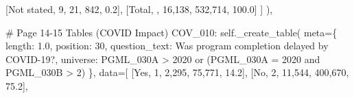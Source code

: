 \documentclass[
  11pt,
  a4paper,
]{article}
\newenvironment{Shaded}{\begin{snugshade}}{\end{snugshade}}
\newcommand{\CommentTok}[1]{\textcolor[rgb]{0.37,0.37,0.37}{#1}}
\newcommand{\NormalTok}[1]{\textcolor[rgb]{0.00,0.23,0.31}{#1}}
\newcommand{\OperatorTok}[1]{\textcolor[rgb]{0.37,0.37,0.37}{#1}}
\newcommand{\StringTok}[1]{\textcolor[rgb]{0.13,0.47,0.30}{#1}}
\newcommand{\VariableTok}[1]{\textcolor[rgb]{0.07,0.07,0.07}{#1}}
\begin{document}
\begin{Shaded}
\begin{Highlighting}[]
\NormalTok{                    [}\StringTok{\textquotesingle{}Not stated\textquotesingle{}}\NormalTok{, }\StringTok{\textquotesingle{}9\textquotesingle{}}\NormalTok{, }\StringTok{\textquotesingle{}21\textquotesingle{}}\NormalTok{, }\StringTok{\textquotesingle{}842\textquotesingle{}}\NormalTok{, }\StringTok{\textquotesingle{}0.2\textquotesingle{}}\NormalTok{],}
\NormalTok{                    [}\StringTok{\textquotesingle{}Total\textquotesingle{}}\NormalTok{, }\StringTok{\textquotesingle{}\textquotesingle{}}\NormalTok{, }\StringTok{\textquotesingle{}16,138\textquotesingle{}}\NormalTok{, }\StringTok{\textquotesingle{}532,714\textquotesingle{}}\NormalTok{, }\StringTok{\textquotesingle{}100.0\textquotesingle{}}\NormalTok{]}
\NormalTok{                ]}
\NormalTok{            ),}
            
            \CommentTok{\# Page 14{-}15 Tables (COVID Impact)}
            \StringTok{\textquotesingle{}COV\_010\textquotesingle{}}\NormalTok{: }\VariableTok{self}\NormalTok{.\_create\_table(}
\NormalTok{                meta}\OperatorTok{=}\NormalTok{\{}
                    \StringTok{\textquotesingle{}length\textquotesingle{}}\NormalTok{: }\StringTok{\textquotesingle{}1.0\textquotesingle{}}\NormalTok{, }\StringTok{\textquotesingle{}position\textquotesingle{}}\NormalTok{: }\StringTok{\textquotesingle{}30\textquotesingle{}}\NormalTok{,}
                    \StringTok{\textquotesingle{}question\_text\textquotesingle{}}\NormalTok{: }\StringTok{\textquotesingle{}Was program completion delayed by COVID{-}19?\textquotesingle{}}\NormalTok{,}
                    \StringTok{\textquotesingle{}universe\textquotesingle{}}\NormalTok{: }\StringTok{\textquotesingle{}PGML\_030A \textgreater{} 2020 or (PGML\_030A = 2020 and PGML\_030B \textgreater{} 2)\textquotesingle{}}
\NormalTok{                \},}
\NormalTok{                data}\OperatorTok{=}\NormalTok{[}
\NormalTok{                    [}\StringTok{\textquotesingle{}Yes\textquotesingle{}}\NormalTok{, }\StringTok{\textquotesingle{}1\textquotesingle{}}\NormalTok{, }\StringTok{\textquotesingle{}2,295\textquotesingle{}}\NormalTok{, }\StringTok{\textquotesingle{}75,771\textquotesingle{}}\NormalTok{, }\StringTok{\textquotesingle{}14.2\textquotesingle{}}\NormalTok{],}
\NormalTok{                    [}\StringTok{\textquotesingle{}No\textquotesingle{}}\NormalTok{, }\StringTok{\textquotesingle{}2\textquotesingle{}}\NormalTok{, }\StringTok{\textquotesingle{}11,544\textquotesingle{}}\NormalTok{, }\StringTok{\textquotesingle{}400,670\textquotesingle{}}\NormalTok{, }\StringTok{\textquotesingle{}75.2\textquotesingle{}}\NormalTok{],}

\end{Highlighting}
\end{Shaded}
\end{document}
